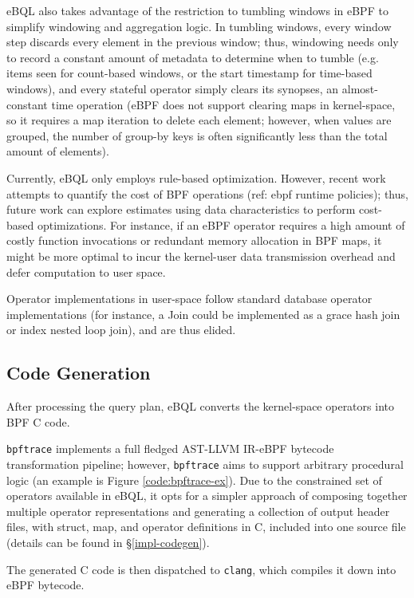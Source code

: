 eBQL also takes advantage of the restriction to tumbling windows in eBPF to simplify windowing and
aggregation logic. In tumbling windows, every window step discards every element in the previous
window; thus, windowing needs only to record a constant amount of metadata to determine when to
tumble (e.g. items seen for count-based windows, or the start timestamp for time-based windows), and
every stateful operator simply clears its synopses, an almost-constant time operation (eBPF does not
support clearing maps in kernel-space, so it requires a map iteration to delete each element;
however, when values are grouped, the number of group-by keys is often significantly less than the
total amount of elements).

Currently, eBQL only employs rule-based optimization. However, recent work attempts to quantify the
cost of BPF operations (ref: ebpf runtime policies); thus, future work can explore estimates using
data characteristics to perform cost-based optimizations. For instance, if an eBPF operator requires
a high amount of costly function invocations or redundant memory allocation in BPF maps, it might be
more optimal to incur the kernel-user data transmission overhead and defer computation to user
space.

Operator implementations in user-space follow standard database operator implementations (for
instance, a Join could be implemented as a grace hash join or index nested loop join), and are thus
elided.

\subsection{Code Generation}

After processing the query plan, eBQL converts the kernel-space operators into BPF C code.

\texttt{bpftrace} implements a full fledged AST-LLVM IR-eBPF bytecode transformation pipeline;
however, \texttt{bpftrace} aims to support arbitrary procedural logic (an example is Figure
\ref{code:bpftrace-ex}). Due to the constrained set of operators available in eBQL, it opts for a
simpler approach of composing together multiple operator representations and generating a collection
of output header files, with struct, map, and operator definitions in C, included into one source
file (details can be found in \S\ref{impl-codegen}).

The generated C code is then dispatched to \texttt{clang}, which compiles it down into eBPF
bytecode.


